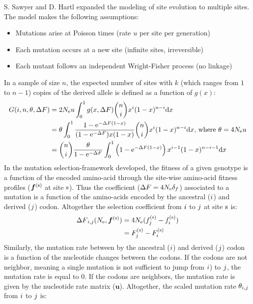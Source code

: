 S. Sawyer and D. Hartl expanded the modeling of site evolution to multiple sites.
The model makes the following assumptions: 
\begin{itemize}
	\setlength\itemsep{-0.2em}
	\item Mutations arise at Poisson times (rate $u$ per site per generation)
	\item Each mutation occurs at a new site (infinite sites, irreversible)
	\item Each mutant follows an independent Wright-Fisher process (no linkage)
\end{itemize}
In a sample of size $n$, the expected number of sites with $k$ (which ranges from $1$ to $n-1$) copies of the derived \gls{allele} is defined as a function of $g(x)$:
\begin{align}
G(i, n, \theta, {\Delta F}) & = 2 N_{\textrm{e}} u \int_{0}^{1} g(x, {\Delta F}) \binom{n}{i} x^{i} (1-x)^{n-i} \mathrm{d} x \nonumber \\
& = \theta \int_{0}^{1} \dfrac{1 - \mathrm{e}^{-{\Delta F} (1-x)}}{(1 - \mathrm{e}^{-{\Delta F}})x(1-x)} \binom{n}{i} x^{i} (1-x)^{n-i} \mathrm{d} x\text{, where } \theta=4N_{\textrm{e}} u \nonumber \\
& = \binom{n}{i} \dfrac{\theta }{1 - \mathrm{e}^{-{\Delta F}}} \int_{0}^{1} \left( 1 - \mathrm{e}^{-{\Delta F} (1-x)} \right) x^{i-1} (1-x)^{n-i-1} \mathrm{d} x
\end{align}
In the mutation selection-framework developed, the fitness of a given genotype is a function of the encoded amino-acid through the site-wise amino-acid fitness profiles ($ \bm{f}^{(\text{s})} $ at site $\text{s}$). Thus the coefficient (${\Delta F}=4N_{\textrm{e}} {\delta_{f}} $) associated to a mutation is a function of the amino-acids encoded by the ancestral (${i}$) and derived (${j}$) \gls{codon}. Altogether the selection coefficient from ${i}$ to ${j}$ at site $\text{s}$ is:
\begin{align}
{\Delta F}_{{i}, {j}}(N_{\textrm{e}}, \bm{f}^{(\text{s})}) &= 4 N_{\textrm{e}} (f_{j}^{(\text{s})}-f_{i}^{(\text{s})}) \nonumber \\
& = F_{j}^{(\text{s})}-F_{i}^{(\text{s})}
\end{align}
Similarly, the mutation rate between by the ancestral (${i}$) and derived (${j}$) \gls{codon} is a function of the nucleotide changes between the \glspl{codon}. If the \glspl{codon} are not neighbor, meaning a single mutation is not sufficient to jump from ${i}$) to ${j}$, the mutation rate is equal to $0$. If the \glspl{codon} are neighbors, the mutation rate is given by the nucleotide rate matrix ($ \bm{u} $). Altogether, the scaled mutation rate $\theta_{{i}, {j}}$ from ${i}$ to ${j}$ is:
